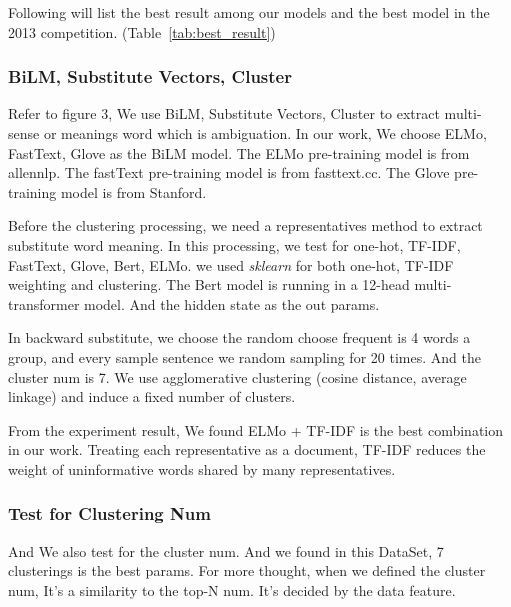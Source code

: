 Following will list the best result among our models and the best model in the 2013 competition. (Table~\ref{tab:best_result})




\subsubsection*{BiLM, Substitute Vectors, Cluster}
Refer to figure 3, We use BiLM, Substitute Vectors, Cluster to extract multi-sense or meanings word which is ambiguation.
In our work, We choose ELMo, FastText, Glove as the BiLM model.
The ELMo pre-training model is from allennlp.
The fastText pre-training model is from   fasttext.cc.
The Glove pre-training model is from  Stanford. 

Before the clustering processing, we need a representatives method to extract substitute word meaning.
In this processing, we test for one-hot, TF-IDF, FastText, Glove, Bert, ELMo.
we used \emph{sklearn} for both one-hot, TF-IDF weighting and clustering.
The Bert model is running in a 12-head multi-transformer model. 
And the hidden state as the out params.

In backward substitute, we choose the random choose frequent is 4 words a group, and every sample sentence we random sampling for  20 times.
And the cluster num is 7.
We use agglomerative clustering (cosine distance, average linkage) and induce a fixed number of clusters.

From the experiment result, We found ELMo + TF-IDF is the best combination in our work.
Treating each representative as a document, TF-IDF reduces the weight of uninformative words shared by many representatives.

\subsubsection*{Test for Clustering Num}



And We also test for the cluster num.
And we found in this DataSet, 7 clusterings is the best params.
For more thought, when we defined the cluster num, It's a similarity to the top-N num.
It's decided by the data feature.